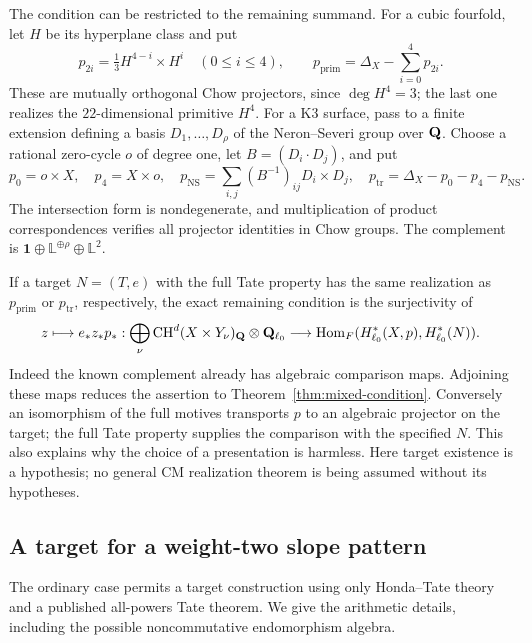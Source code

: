 The condition can be restricted to the remaining summand.
For a cubic fourfold, let $H$ be its hyperplane class and put
\[
 p_{2i}=\tfrac13 H^{4-i}\times H^i\quad(0\le i\le4),
 \qquad p_{\mathrm{prim}}=\Delta_X-\sum_{i=0}^4p_{2i}.
\]
These are mutually orthogonal Chow projectors, since $\deg H^4=3$;
the last one realizes the $22$-dimensional primitive $H^4$.
For a K3 surface, pass to a finite extension defining a basis
$D_1,\ldots,D_\rho$ of the Neron--Severi group over $\mathbf Q$.
Choose a rational zero-cycle $o$ of degree one, let
$B=(D_i\cdot D_j)$, and put
\[
 p_0=o\times X,\quad p_4=X\times o,\quad
 p_{\mathrm{NS}}=\sum_{i,j}(B^{-1})_{ij}D_i\times D_j,\quad
 p_{\mathrm{tr}}=\Delta_X-p_0-p_4-p_{\mathrm{NS}}.
\]
The intersection form is nondegenerate, and multiplication of
product correspondences verifies all projector identities in Chow
groups. The complement is
$\mathbf1\oplus\mathbb L^{\oplus\rho}\oplus\mathbb L^2$.

If a target $N=(T,e)$ with the full Tate property has the same
realization as $p_{\mathrm{prim}}$ or $p_{\mathrm{tr}}$, respectively,
the exact remaining condition is the surjectivity of
\[
 z\longmapsto e_*z_*p_*:
 \bigoplus_\nu\operatorname{CH}^{d}(X\times Y_\nu)_{\mathbf Q}
            \otimes\mathbf Q_{\ell_0}
 \longrightarrow
 \operatorname{Hom}_F(H^*_{\ell_0}(X,p),H^*_{\ell_0}(N)).
\]
Indeed the known complement already has algebraic comparison maps.
Adjoining these maps reduces the assertion to
Theorem~\ref{thm:mixed-condition}. Conversely an isomorphism of the
full motives transports $p$ to an algebraic projector on the target;
the full Tate property supplies the comparison with the specified
$N$. This also explains why the choice of a presentation is harmless.
Here target existence is a hypothesis; no general CM realization
theorem is being assumed without its hypotheses.

\subsection{A target for a weight-two slope pattern}

The ordinary case permits a target construction using only
Honda--Tate theory and a published all-powers Tate theorem. We give
the arithmetic details, including the possible noncommutative
endomorphism algebra.

